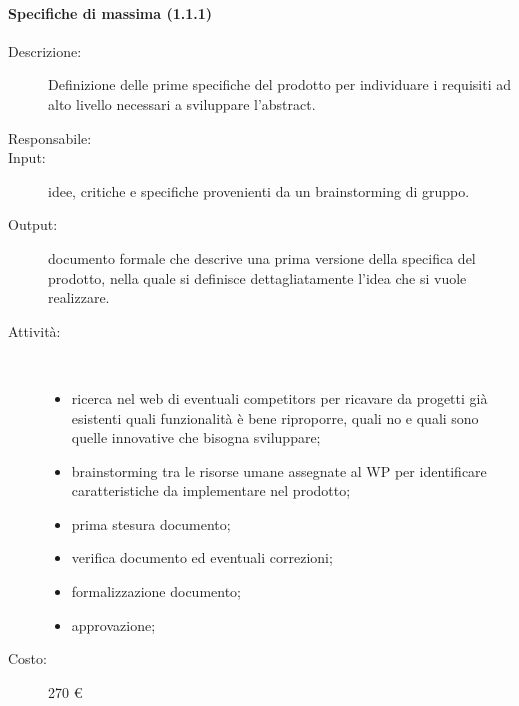 \paragraph{Specifiche di massima (1.1.1)}
\begin{description}
\item[Descrizione:] Definizione delle prime specifiche del prodotto per individuare i requisiti ad alto livello necessari a sviluppare l'abstract.
\item[Responsabile:]
\item[Input:] idee, critiche e specifiche provenienti da un brainstorming di gruppo.
\item[Output:] documento formale che descrive una prima versione della specifica del prodotto, nella quale si definisce dettagliatamente l'idea che si vuole realizzare.
\item[Attività:]\mbox{}\\[-1.5\baselineskip]
	\begin{itemize}
	\item ricerca nel web di eventuali competitors per ricavare da progetti gi\`{a} esistenti quali funzionalit\`{a} \`{e} bene riproporre, quali no e quali sono quelle innovative che bisogna sviluppare;
	\item brainstorming tra le risorse umane assegnate al WP per identificare caratteristiche da implementare nel prodotto;
	\item prima stesura documento;
	\item verifica documento ed eventuali correzioni;
	\item formalizzazione documento;
	\item approvazione;
	\end{itemize}
\item[Costo:] 270 \euro{}


\end{description}
